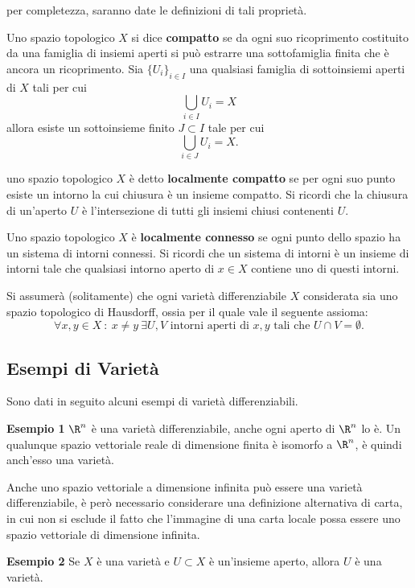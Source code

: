 \documentclass[10pt, letterpaper]{report}
\begin{document}
per completezza, saranno date le definizioni di tali proprietà.
\begin{definizione}
    Uno spazio topologico $X$ si dice \textbf{compatto} se da ogni suo ricoprimento costituito da una famiglia di insiemi aperti si può estrarre una sottofamiglia finita che è ancora un ricoprimento. Sia $\{U_i\}_{i\in I}$ una qualsiasi famiglia di sottoinsiemi aperti di $X$ tali per cui\begin{equation}
        \bigcup_{i\in I}U_i=X 
    \end{equation}
    allora esiste un sottoinsieme finito $J\subset I$ tale per cui
    \begin{equation}
        \bigcup_{i\in J}U_i=X .
    \end{equation}
\end{definizione}
\begin{definizione}
    uno spazio topologico $X$ è detto \textbf{localmente compatto} se per ogni suo punto esiste un intorno la cui chiusura è un insieme compatto. Si ricordi che la chiusura di un'aperto $U$ è l'intersezione di tutti gli insiemi chiusi contenenti $U$.
\end{definizione}
\begin{definizione}
    Uno spazio topologico $X$ è \textbf{localmente connesso} se ogni punto dello spazio ha un sistema di intorni connessi. Si ricordi che un sistema di intorni è un insieme di intorni tale che qualsiasi intorno aperto di $x\in X$ contiene uno di questi intorni.
\end{definizione}
Si assumerà (solitamente) che ogni varietà differenziabile $X$ considerata sia uno spazio topologico di Hausdorff, ossia per il quale vale il seguente assioma:\begin{equation}
    \forall x,y\in X\ : \ x\ne y \ \exists U,V \text{ intorni aperti di }x,y\text{ tali che }U\cap V = \emptyset .
\end{equation}
\subsection{Esempi di Varietà}
Sono dati in seguito alcuni esempi di varietà differenziabili.\bigskip


\noindent\textbf{Esempio 1} $\R^n$ è una varietà differenziabile, anche ogni aperto di $\R^n$ lo è. Un qualunque spazio vettoriale reale di dimensione finita è isomorfo a $\R^n$, è quindi anch'esso una varietà.
\begin{osservazione}
    Anche uno spazio vettoriale a dimensione infinita può essere una varietà differenziabile, è però necessario considerare una definizione alternativa di carta, in cui non si esclude il fatto che l'immagine di una carta locale possa essere uno spazio vettoriale di dimensione infinita.
\end{osservazione}
\textbf{Esempio 2} Se $X$ è una varietà e $U\subset X$ è un'insieme aperto, allora $U$ è una varietà.
\bigskip
\end{document}
